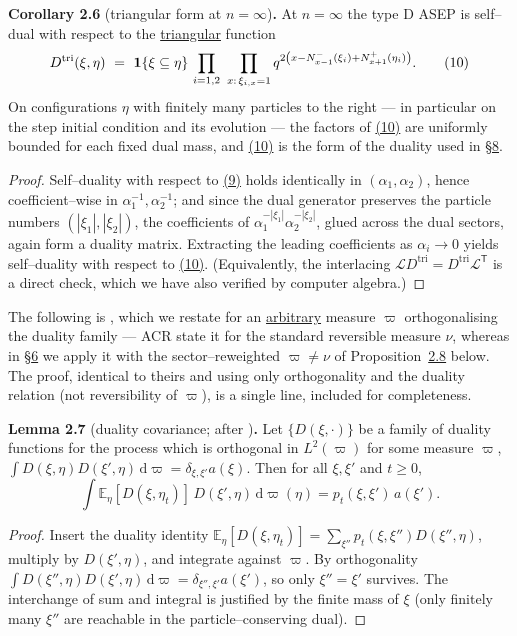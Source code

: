 \documentclass[11pt]{article}
\theoremstyle{plain}
\theoremstyle{definition}
\theoremstyle{remark}
\newcommand{\E}{\mathbb{E}}\newcommand{\PP}{\mathbb{P}}\newcommand{\dd}{\,\mathrm{d}}
\newcommand{\cL}{\mathcal L}\newcommand{\cO}{\mathcal O}\newcommand{\cE}{\mathcal E}
\begin{document}
\label{cor_tri}\noindent\textbf{Corollary 2.6} (triangular form at $n=\infty$)\textbf{.} 
At $n=\infty$ the type D ASEP is self--dual with respect to the \underline{triangular}
function
\label{eq_Dtri}
\begin{equation}
  D^{\mathrm{tri}}(\xi,\eta)\ =\ \bone\{\xi\subseteq\eta\}\,
  \prod_{i=1,2}\ \prod_{x:\,\xi_{i,x}=1}
  q^{2\left(x-N^-_{x-1}(\xi_i)+N^+_{x+1}(\eta_i)\right)}.\qquad(10)
\end{equation}
On configurations $\eta$ with finitely many particles to
the right --- in particular on the step initial condition and its evolution --- the
factors of \hyperref[eq_Dtri]{(10)} are uniformly bounded for each fixed dual mass, and
\hyperref[eq_Dtri]{(10)} is the form of the duality used in \S\hyperref[sec_tw]{8}.
\par
\begin{proof}
Self--duality with respect to \hyperref[eq_Dreu]{(9)} holds identically in
$(\alpha_1,\alpha_2)$, hence coefficient--wise in $\alpha_1^{-1},\alpha_2^{-1}$; and
since the dual generator preserves the particle numbers $(|\xi_1|,|\xi_2|)$, the
coefficients of $\alpha_1^{-|\xi_1|}\alpha_2^{-|\xi_2|}$, glued across the dual
sectors, again form a duality matrix. Extracting the leading coefficients as
$\alpha_i\to0$ yields self--duality with respect to \hyperref[eq_Dtri]{(10)}. (Equivalently,
the interlacing $\cL D^{\mathrm{tri}}=D^{\mathrm{tri}}\cL^{\mathsf T}$ is a direct
check, which we have also verified by computer algebra.)
\end{proof}

The following is \cite[Lem.~2.1]{ACR}, which we restate for an \underline{arbitrary}
measure $\varpi$ orthogonalising the duality family --- ACR state it for the standard
reversible measure $\nu$, whereas in \S\hyperref[sec_ew]{6} we apply it with the
sector--reweighted $\varpi\ne\nu$ of Proposition~\hyperref[prop_orth]{2.8} below. The proof, identical
to theirs and using only orthogonality and the duality relation (not reversibility of
$\varpi$), is a single line, included for completeness.

\label{lem_acr}\noindent\textbf{Lemma 2.7} (duality covariance; {after \cite[Lem.~2.1]{ACR}})\textbf{.} 
Let $\{D(\xi,\cdot)\}$ be a family of duality functions for the process which is
orthogonal in $L^2(\varpi)$ for some measure $\varpi$,
$\int D(\xi,\eta)D(\xi',\eta)\dd\varpi=\delta_{\xi,\xi'}a(\xi)$. Then for all
$\xi,\xi'$ and $t\ge0$,
\[
  \int \E_\eta[D(\xi,\eta_t)]\,D(\xi',\eta)\dd\varpi(\eta)=p_t(\xi,\xi')\,a(\xi').
\]
\par
\begin{proof}
Insert the duality identity
$\E_\eta[D(\xi,\eta_t)]=\sum_{\xi''}p_t(\xi,\xi'')D(\xi'',\eta)$, multiply by
$D(\xi',\eta)$, and integrate against $\varpi$. By orthogonality
$\int D(\xi'',\eta)D(\xi',\eta)\dd\varpi=\delta_{\xi'',\xi'}a(\xi')$, so only
$\xi''=\xi'$
survives. The interchange of sum and integral is justified by the finite mass of
$\xi$ (only finitely many $\xi''$ are reachable in the particle--conserving dual).
\end{proof}
\end{document}
